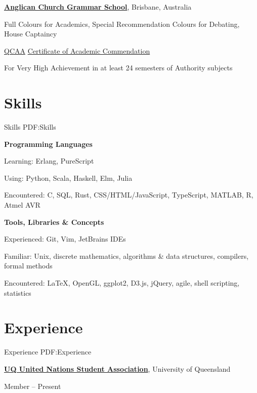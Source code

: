 \documentclass[a4paper,10pt,oneside]{article}
\begin{document}
\begin{body}
\EntryGap

\href{https://www.churchie.com.au/}{\textbf{Anglican Church Grammar School}}, Brisbane, Australia
\par Full Colours for Academics, Special Recommendation Colours for Debating, House Captaincy \hfill {}
\par \href{https://www.qcaa.qld.edu.au/}{QCAA} \href{https://www.qcaa.qld.edu.au/senior/certificates-qualifications/qce/qce-achievement-awards/certificate-academic-commendation/2014}{Certificate of Academic Commendation} \hfill {}
\begin{detail}
For Very High Achievement in at least 24 semesters of Authority subjects
\end{detail}


\section
{Skills}
{Skills}
{PDF:Skills}

\textbf{Programming Languages}
\par Learning: Erlang, PureScript
\par Using: Python, Scala, Haskell, Elm, Julia
\par Encountered: C, SQL, Rust, CSS/HTML/JavaScript, TypeScript, MATLAB, R, Atmel AVR

\EntryGap

\textbf{Tools, Libraries \& Concepts}
\par Experienced: Git, Vim, JetBrains IDEs
\par Familiar: Unix, discrete mathematics, algorithms \& data structures, compilers, formal methods
\par Encountered: \LaTeX, OpenGL, ggplot2, D3.js, jQuery, agile, shell scripting, statistics


\section
{Experience}
{Experience}
{PDF:Experience}

\href{http://www.unsauq.org/}
{\textbf{UQ United Nations Student Association}}, University of Queensland

\par Member \hfill {} -- Present


\end{body}
\end{document}

